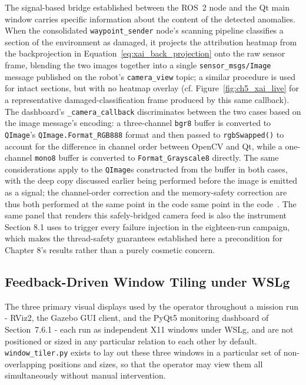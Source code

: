 The signal-based bridge established between the ROS~2 node and the Qt main window carries specific information about the content of the detected anomalies. When the consolidated \texttt{waypoint\_sender} node's scanning pipeline classifies a section of the environment as damaged, it projects the attribution heatmap from the backprojection in Equation~\ref{eq:xai_back_projection} onto the raw sensor frame, blending the two images together into a single \texttt{sensor\_msgs/Image} message published on the robot's \texttt{camera\_view} topic; a similar procedure is used for intact sections, but with no heatmap overlay (cf. Figure~\ref{fig:ch5_xai_live} for a representative damaged-classification frame produced by this same callback). The dashboard's \texttt{\_camera\_callback} discriminates between the two cases based on the image message's encoding: a three-channel \texttt{bgr8} buffer is converted to \texttt{QImage}'s \texttt{QImage.Format\_RGB888} format and then passed to \texttt{rgbSwapped()} to account for the difference in channel order between OpenCV and Qt, while a one-channel \texttt{mono8} buffer is converted to \texttt{Format\_Grayscale8} directly. The same considerations apply to the \texttt{QImage}s constructed from the buffer in both cases, with the deep copy discussed earlier being performed before the image is emitted as a signal; the channel-order correction and the memory-safety correction are thus both performed at the same point in the code same point in the code~\cite{macenski2022robot,albatati2026ros2}. The same panel that renders this safely-bridged camera feed is also the instrument Section 8.1 uses to trigger every failure injection in the eighteen-run campaign, which makes the thread-safety guarantees established here a precondition for Chapter 8's results rather than a purely cosmetic concern.

\subsection{Feedback-Driven Window Tiling under WSLg}

The three primary visual displays used by the operator throughout a mission run - RViz2, the Gazebo GUI client, and the PyQt5 monitoring dashboard of Section~7.6.1 - each run as independent X11 windows under WSLg, and are not positioned or sized in any particular relation to each other by default. \texttt{window\_tiler.py} exists to lay out these three windows in a particular set of non-overlapping positions and sizes, so that the operator may view them all simultaneously without manual intervention.

